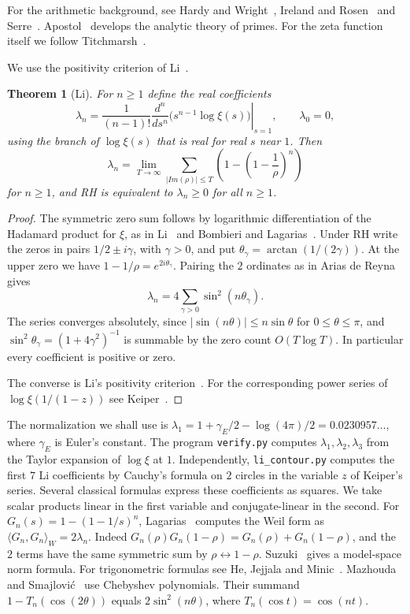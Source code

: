 \documentclass[11pt,a4paper]{article}
\newtheorem{thm}{Theorem}[section]
\begin{document}
For the arithmetic background, see Hardy and Wright~\cite{hw}, Ireland and Rosen~\cite{ir} and Serre~\cite{serre}. Apostol~\cite{apostol} develops the analytic theory of primes. For the zeta function itself we follow Titchmarsh~\cite{titchmarsh}.

We use the positivity criterion of Li~\cite{li-ref}.

\begin{samepage}
\begin{thm}[Li]\label{li}
For $n\geq1$ define the real coefficients
\[
 \lambda_n=\frac{1}{(n-1)!}\left.\frac{d^n}{ds^n}
             \big(s^{n-1}\log\xi(s)\big)\right|_{s=1},
 \qquad \lambda_0=0,
\]
using the branch of $\log\xi(s)$ that is real for real $s$ near $1$. Then
\[
 \lambda_n=\lim_{T\to\infty}\sum_{|Im(\rho)|\leq T}
              \left(1-\left(1-\frac1\rho\right)^n\right)
\]
for $n\geq1$, and RH is equivalent to $\lambda_n\geq0$ for all $n\geq1$.
\end{thm}
\end{samepage}
\begin{proof}
The symmetric zero sum follows by logarithmic differentiation of the Hadamard product for $\xi$, as in Li~\cite{li-ref} and Bombieri and Lagarias~\cite{bl}. Under RH write the zeros in pairs $1/2\pm i\gamma$, with $\gamma>0$, and put $\theta_\gamma=\arctan(1/(2\gamma))$. At the upper zero we have $1-1/\rho=e^{2i\theta_\gamma}$. Pairing the $2$ ordinates as in Arias de Reyna~\cite{arias} gives
\[
 \lambda_n=4\sum_{\gamma>0}\sin^2(n\theta_\gamma).
\]
The series converges absolutely, since $|\sin(n\theta)|\leq n\sin\theta$ for $0\leq\theta\leq\pi$, and $\sin^2\theta_\gamma=(1+4\gamma^2)^{-1}$ is summable by the zero count $O(T\log T)$. In particular every coefficient is positive or zero.

The converse is Li's positivity criterion~\cite{li-ref}. For the corresponding power series of $\log\xi(1/(1-z))$ see Keiper~\cite{keiper}.
\end{proof}

The normalization we shall use is $\lambda_1=1+\gamma_E/2-\log(4\pi)/2=0.0230957\ldots$, where $\gamma_E$ is Euler's constant. The program \texttt{verify.py} computes $\lambda_1,\lambda_2,\lambda_3$ from the Taylor expansion of $\log\xi$ at $1$. Independently, \texttt{li\_contour.py} computes the first $7$ Li coefficients by Cauchy's formula on $2$ circles in the variable $z$ of Keiper's series. Several classical formulas express these coefficients as squares. We take scalar products linear in the first variable and conjugate-linear in the second. For $G_n(s)=1-(1-1/s)^n$, Lagarias~\cite{lagarias} computes the Weil form as $\langle G_n,G_n\rangle_W=2\lambda_n$. Indeed $G_n(\rho)G_n(1-\rho)=G_n(\rho)+G_n(1-\rho)$, and the $2$ terms have the same symmetric sum by $\rho\leftrightarrow1-\rho$. Suzuki~\cite{suzuki} gives a model-space norm formula. For trigonometric formulas see He, Jejjala and Minic~\cite{hjm}. Mazhouda and Smajlovi\'c~\cite{ms} use Chebyshev polynomials. Their summand $1-T_n(\cos(2\theta))$ equals $2\sin^2(n\theta)$, where $T_n(\cos t)=\cos(nt)$.
\end{document}
